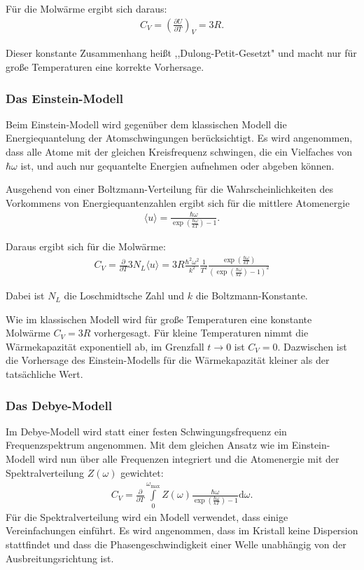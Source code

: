 Für die Molwärme ergibt sich daraus:
\begin{align}
	C_V = \left(\frac{\partial U}{\partial T}\right)_V = 3R.
\end{align}

Dieser konstante Zusammenhang heißt ,,Dulong-Petit-Gesetzt" und macht nur für große Temperaturen eine korrekte Vorhersage.

\subsubsection{Das Einstein-Modell}
Beim Einstein-Modell wird gegenüber dem klassischen Modell die Energiequantelung der Atomschwingungen berücksichtigt.
Es wird angenommen, dass alle Atome mit der gleichen Kreisfrequenz schwingen, die ein Vielfaches von $\hbar\omega$ ist, und auch nur gequantelte Energien aufnehmen oder abgeben können.

Ausgehend von einer Boltzmann-Verteilung für die Wahrscheinlichkeiten des Vorkommens von Energiequantenzahlen ergibt sich für die mittlere Atomenergie
\begin{align}
	\langle u \rangle = \frac{\hbar \omega}{\exp \left( \frac{\hbar \omega}{kT} \right)-1}.
\end{align}

Daraus ergibt sich für die Molwärme:
\begin{align}
	C_V = \frac{\partial}{\partial T} 3N_L \langle u \rangle = 3R \frac{\hbar^2 \omega^2}{k^2}\frac{1}{T^2}\frac{\exp \left(\frac{\hbar\omega}{k T}\right)}{\left(\exp\left(\frac{\hbar\omega}{k T}\right) - 1\right)^2}
\end{align}

Dabei ist $N_L$ die Loschmidtsche Zahl und $k$ die Boltzmann-Konstante.

Wie im klassischen Modell wird für große Temperaturen eine konstante Molwärme $C_V = 3R$ vorhergesagt.
Für kleine Temperaturen nimmt die Wärmekapazität exponentiell ab, im Grenzfall $t \rightarrow 0$ ist $C_V = 0$.
Dazwischen ist die Vorhersage des Einstein-Modells für die Wärmekapazität kleiner als der tatsächliche Wert.

\subsubsection{Das Debye-Modell}

Im Debye-Modell wird statt einer festen Schwingungsfrequenz ein Frequenzspektrum angenommen.
Mit dem gleichen Ansatz wie im Einstein-Modell wird nun über alle Frequenzen integriert und die Atomenergie mit der Spektralverteilung $Z(\omega)$ gewichtet:
\begin{align}
	\label{debye1}
	C_V = \frac{\partial}{\partial T} \int\limits_{0}^{\omega_\mathrm{max}} Z(\omega) \frac{\hbar \omega}{\exp \left( \frac{\hbar \omega}{kT} \right)-1} \mathrm{d}\omega.
\end{align}
Für die Spektralverteilung wird ein Modell verwendet, dass einige Vereinfachungen einführt.
Es wird angenommen, dass im Kristall keine Dispersion stattfindet und dass die Phasengeschwindigkeit einer Welle unabhängig von der Ausbreitungsrichtung ist.

